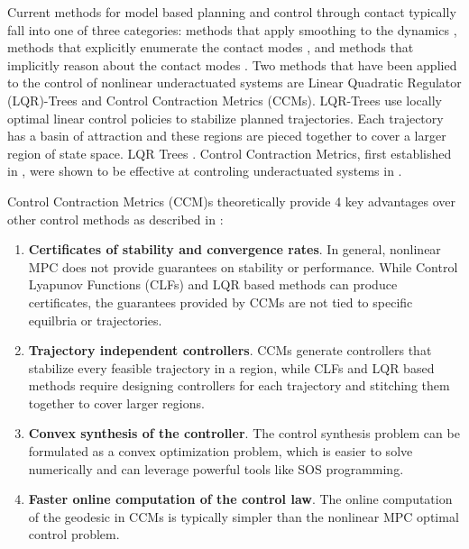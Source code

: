 \documentclass[journal]{IEEEtran}
\begin{document}
Current methods for model based planning and control through contact typically fall into one of three categories: methods that apply smoothing to the dynamics \autocite{stewartOptimalControlSystems2010,pangGlobalPlanningContactRich2023}, methods that explicitly enumerate the contact modes \autocite{hoganFeedbackControlPusherSlider2016}, and methods that implicitly reason about the contact modes \autocite{sleimanContactImplicitTrajectoryOptimization2019,nakatsuruImplicitContactRichManipulation2023,posaDirectMethodTrajectory2014}. Two methods that have been applied to the control of nonlinear underactuated systems are Linear Quadratic Regulator (LQR)-Trees and Control Contraction Metrics (CCMs). LQR-Trees use locally optimal linear control policies to stabilize planned trajectories. Each trajectory has a basin of attraction and these regions are pieced together to cover a larger region of state space.
LQR Trees \autocite{tedrakeLQRtreesFeedbackMotion2010}. Control Contraction Metrics, first established in \autocite{manchesterControlContractionMetrics2017}, were shown to be effective at controling underactuated systems in \autocite{manchesterUnifyingRobotTrajectory2018}.

Control Contraction Metrics (CCM)s theoretically provide 4 key advantages over other control methods as described in \autocite{manchesterControlContractionMetrics2017,manchesterUnifyingRobotTrajectory2018,singhRobustOnlineMotion2017,weiControlContractionMetric2021}:
\begin{enumerate}
	\item {\bf Certificates of stability and convergence rates}. In general, nonlinear MPC does not provide guarantees on stability or performance. While Control Lyapunov Functions (CLFs) and LQR based methods can produce certificates, the guarantees provided by CCMs are not tied to specific equilbria or trajectories.
	\item {\bf Trajectory independent controllers}. CCMs generate controllers that stabilize every feasible trajectory in a region, while CLFs and LQR based methods require designing controllers for each trajectory and stitching them together to cover larger regions.
	\item {\bf Convex synthesis of the controller}. The control synthesis problem can be formulated as a convex optimization problem, which is easier to solve numerically and can leverage powerful tools like SOS programming.
	\item {\bf Faster online computation of the control law}. The online computation of the geodesic in CCMs is typically simpler than the nonlinear MPC optimal control problem.
\end{enumerate}
\end{document}
